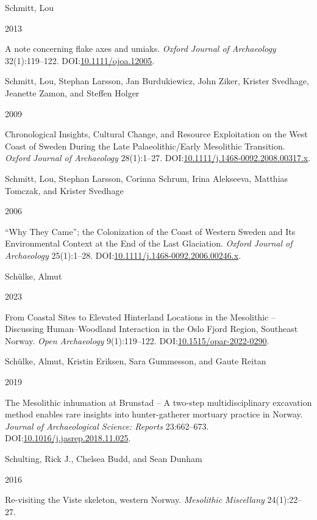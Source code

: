 \documentclass[
  12pt,
  a4paper,
  oneside]{book}
\newlength{\cslhangindent}
\newlength{\csllabelwidth}
\newlength{\cslentryspacingunit} %
\newenvironment{CSLReferences}[2] %
 {%
  \setlength{\parindent}{0pt}
  \ifodd #1
  \let\oldpar\par
  \def\par{\hangindent=\cslhangindent\oldpar}
  \fi
  \setlength{\parskip}{#2\cslentryspacingunit}
 }%
 {}
\newcommand{\CSLBlock}[1]{#1\hfill\break}
\newcommand{\CSLLeftMargin}[1]{\parbox[t]{\csllabelwidth}{#1}}
\newcommand{\CSLRightInline}[1]{\parbox[t]{\linewidth - \csllabelwidth}{#1}\break}
\begin{document}
\begin{CSLReferences}{0}{0}
\leavevmode{}%
\CSLBlock{Schmitt, Lou}
\CSLLeftMargin{ 2013}%
\CSLRightInline{{A note concerning flake axes and umiaks}. \emph{Oxford Journal of Archaeology} 32(1):119--122. DOI:\href{https://doi.org/10.1111/ojoa.12005}{10.1111/ojoa.12005}.}

\leavevmode{}%
\CSLBlock{Schmitt, Lou, Stephan Larsson, Jan Burdukiewicz, John Ziker, Krister Svedhage, Jeanette Zamon, and Steffen Holger}
\CSLLeftMargin{ 2009}%
\CSLRightInline{{Chronological Insights, Cultural Change, and Resource Exploitation on the West Coast of Sweden During the Late Palaeolithic/Early Mesolithic Transition}. \emph{Oxford Journal of Archaeology} 28(1):1--27. DOI:\href{https://doi.org/10.1111/j.1468-0092.2008.00317.x}{10.1111/j.1468-0092.2008.00317.x}.}

\leavevmode{}%
\CSLBlock{Schmitt, Lou, Stephan Larsson, Corinna Schrum, Irina Alekseeva, Matthias Tomczak, and Krister Svedhage}
\CSLLeftMargin{ 2006}%
\CSLRightInline{{{``Why They Came''}; the Colonization of the Coast of Western Sweden and Its Environmental Context at the End of the Last Glaciation}. \emph{Oxford Journal of Archaeology} 25(1):1--28. DOI:\href{https://doi.org/10.1111/j.1468-0092.2006.00246.x}{10.1111/j.1468-0092.2006.00246.x}.}

\leavevmode{}%
\CSLBlock{Schülke, Almut}
\CSLLeftMargin{ 2023}%
\CSLRightInline{{From Coastal Sites to Elevated Hinterland Locations in the Mesolithic -- Discussing Human--Woodland Interaction in the Oslo Fjord Region, Southeast Norway}. \emph{Open Archaeology} 9(1):119--122. DOI:\href{https://doi.org/10.1515/opar-2022-0290}{10.1515/opar-2022-0290}.}

\leavevmode{}%
\CSLBlock{Schülke, Almut, Kristin Eriksen, Sara Gummesson, and Gaute Reitan}
\CSLLeftMargin{ 2019}%
\CSLRightInline{{The Mesolithic inhumation at Brunstad -- A two-step multidisciplinary excavation method enables rare insights into hunter-gatherer mortuary practice in Norway}. \emph{Journal of Archaeological Science: Reports} 23:662--673. DOI:\href{https://doi.org/10.1016/j.jasrep.2018.11.025}{10.1016/j.jasrep.2018.11.025}.}

\leavevmode{}%
\CSLBlock{Schulting, Rick J., Chelsea Budd, and Sean Dunham}
\CSLLeftMargin{ 2016}%
\CSLRightInline{{Re-visiting the Viste skeleton, western Norway}. \emph{Mesolithic Miscellany} 24(1):22--27.}


\end{CSLReferences}
\end{document}
